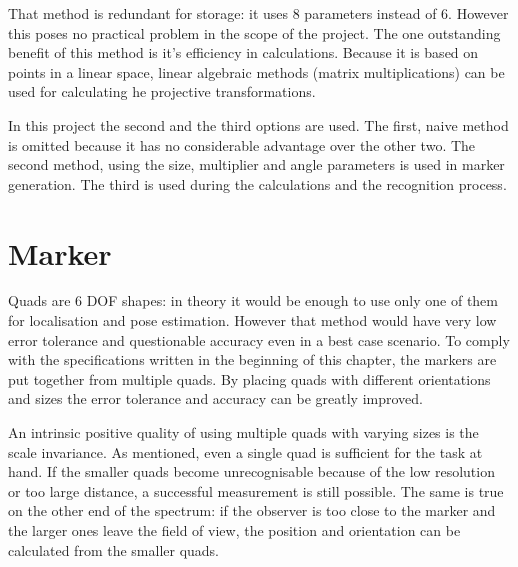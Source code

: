 That method is redundant for storage: it uses 8 parameters instead of 6.
However this poses no practical problem in the scope of the project.
The one outstanding benefit of this method is it's efficiency in calculations.
Because it is based on points in a linear space, linear algebraic methods (matrix multiplications) can be used for calculating he projective transformations.

In this project the second and the third options are used.
The first, naive method is omitted because it has no considerable advantage over the other two.
The second method, using the size, multiplier and angle parameters is used in marker generation.
The third is used during the calculations and the recognition process.

\section{Marker}

Quads are 6 DOF shapes: in theory it would be enough to use only one of them for localisation and pose estimation.
However that method would have very low error tolerance and questionable accuracy even in a best case scenario.
To comply with the specifications written in the beginning of this chapter, the markers are put together from multiple quads.
By placing quads with different orientations and sizes the error tolerance and accuracy can be greatly improved.

An intrinsic positive quality of using multiple quads with varying sizes is the scale invariance.
As mentioned, even a single quad is sufficient for the task at hand.
If the smaller quads become unrecognisable because of the low resolution or too large distance, a successful measurement is still possible.
The same is true on the other end of the spectrum: if the observer is too close to the marker and the larger ones leave the field of view, the position and orientation can be calculated from the smaller quads.

